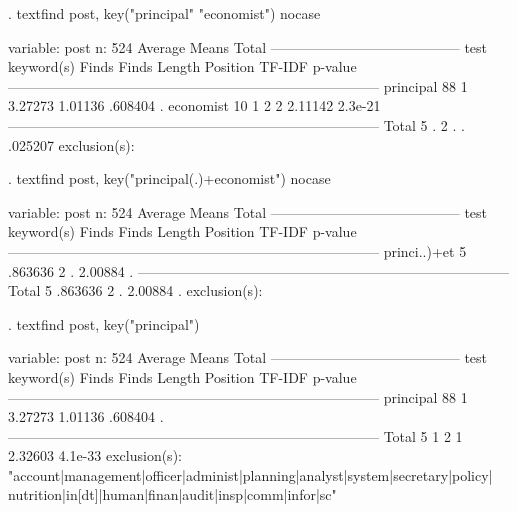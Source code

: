 {\smallskip}
. textfind post, key("principal" "economist") nocase

{\smallskip}
                               {}
variable:   post
n: 524                                       Average                       Means
                    Total   -----------------------------------------       test
keyword(s)          Finds      Finds     Length   Position     TF-IDF    p-value
--------------------------------------------------------------------------------
principal              88          1    3.27273    1.01136    .608404          .
economist              10          1          2          2    2.11142    2.3e-21
--------------------------------------------------------------------------------
Total                   5          .          2          .          .    .025207
exclusion(s):
{\smallskip}

. textfind post, key("principal(.)+economist") nocase

{\smallskip}
                               {}
variable:   post
n: 524                                       Average                       Means
                    Total   -----------------------------------------       test
keyword(s)          Finds      Finds     Length   Position     TF-IDF    p-value
--------------------------------------------------------------------------------
princi..)+e{\tytilde}t           5    .863636          2          .    2.00884          .
--------------------------------------------------------------------------------
Total                   5    .863636          2          .    2.00884          .
exclusion(s):
{\smallskip}

. textfind post, key("principal")

{\smallskip}
                               {}
variable:   post
n: 524                                       Average                       Means
                    Total   -----------------------------------------       test
keyword(s)          Finds      Finds     Length   Position     TF-IDF    p-value
--------------------------------------------------------------------------------
principal              88          1    3.27273    1.01136    .608404          .
--------------------------------------------------------------------------------
Total                   5          1          2          1    2.32603    4.1e-33
exclusion(s):
"account|management|officer|administ|planning|analyst|system|secretary|policy|
nutrition|in[dt]|human|finan|audit|insp|comm|infor|sc"
